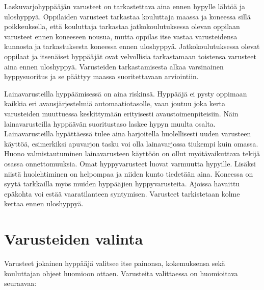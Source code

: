 
Laskuvarjohyppääjän varusteet on tarkastettava aina ennen hypylle lähtöä ja uloshyppyä. Oppilaiden varusteet tarkastaa kouluttaja maassa ja koneessa sillä poikkeuksella, että kouluttaja tarkastaa jatkokoulutuksessa olevan oppilaan varusteet ennen koneeseen nousua, mutta oppilas itse vastaa varusteidensa kunnosta ja tarkastuksesta koneessa ennen uloshyppyä. Jatkokoulutuksessa olevat oppilaat ja itsenäiset hyppääjät ovat velvollisia tarkastamaan toistensa varusteet aina ennen uloshyppyä. Varusteiden tarkastamisesta alkaa varsinainen hyppysuoritus ja se päättyy maassa suoritettavaan arviointiin. 


Lainavarusteilla hyppäämisessä on aina riskinsä. Hyppääjä ei pysty oppimaan kaikkia eri avausjärjestelmiä automaatiotasolle, vaan joutuu joka kerta varusteiden muuttuessa keskittymään erityisesti avaustoimenpiteisiin. Näin lainavarusteilla hyppäävän suoritustaso laskee hypyn muulta osalta. Lainavarusteilla hypättäessä tulee aina harjoitella huolellisesti uuden varusteen käyttöä, esimerkiksi apuvarjon tasku voi olla lainavarjossa tiukempi kuin omassa. Huono valmistautuminen lainavarusteen käyttöön on ollut myötävaikuttava tekijä osassa onnettomuuksia. Omat hyppyvarusteet luovat varmuutta hypyille. Lisäksi niistä huolehtiminen on helpompaa ja niiden kunto tiedetään aina. Koneessa on syytä tarkkailla myös muiden hyppääjien hyppyvarusteita. Ajoissa havaittu epäkohta voi estää vaaratilanteen syntymisen. Varusteet tarkistetaan kolme kertaa ennen uloshyppyä. 

\section{ Varusteiden valinta }
\label{varusteiden-tarkastus-varusteiden-valinta}


Varusteet jokainen hyppääjä valitsee itse painonsa, kokemuksensa sekä kouluttajan ohjeet huomioon ottaen. Varusteita valittaessa on huomioitava seuraavaa: 

